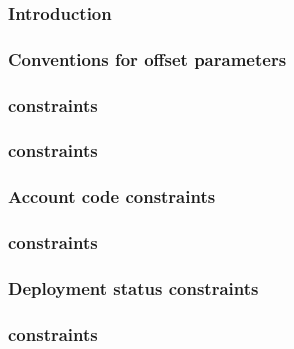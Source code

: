 \subsubsection{Introduction}                                         \label{hub: account: specialized constraints: intro}                        
\subsubsection{Conventions for offset parameters}                    \label{hub: account: specialized constraints: conventions}                  
\subsubsection{\accNonce{} constraints             \lispDone{}}      \label{hub: account: specialized constraints: nonce}                        
\subsubsection{\accBalance{} constraints           \lispDone{}}      \label{hub: account: specialized constraints: balance}                      
\subsubsection{Account code constraints            \lispDone{}}      \label{hub: account: specialized constraints: code}                         
\subsubsection{\accWarmth{} constraints            \lispDone{}}      \label{hub: account: specialized constraints: warmth}                       
\subsubsection{Deployment status constraints       \lispDone{}}      \label{hub: account: specialized constraints: deployment}                   
\subsubsection{\accMarkedForDeletion{} constraints \lispDone{}}      \label{hub: account: specialized constraints: marked for selfdestruct}      
